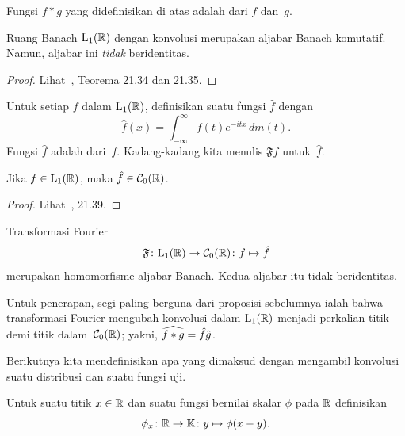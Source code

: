 \begin{defn} Fungsi $f \ast g$ yang didefinisikan di atas adalah
 dari $f$ dan~$g$.
\end{defn}

\begin{prop} Ruang Banach $\mathrm{L_{1}}(\mathbb{R})$ dengan konvolusi merupakan aljabar Banach komutatif. Namun, aljabar ini \emph{tidak} beridentitas.
\end{prop}

\begin{proof} Lihat~\cite{HewittS:1965}, Teorema 21.34 dan 21.35.  \ns
\end{proof}

\begin{defn}\label{defn_Fourier_transform} Untuk setiap $f$ dalam $\mathrm{L_{1}}(\mathbb{R})$, definisikan suatu fungsi $\hat f$ dengan
    \[ \hat f(x) = \int_{-\infty}^\infty f(t) e^{-itx}\,dm(t). \]
Fungsi $\hat f$ adalah
 dari~$f$. Kadang-kadang kita menulis $\mathfrak Ff$ untuk~$\hat f$.
\end{defn}

\begin{thm} Jika $f \in \mathrm{L_{1}}(\mathbb{R})$,
maka $\hat f \in \mathcal{C}_0(\mathbb{R})$.
\end{thm}

\begin{proof} Lihat~\cite{HewittS:1965}, 21.39.   \ns
\end{proof}

\begin{prop} Transformasi Fourier
   \[ \mathfrak F\colon \mathrm{L_{1}}(\mathbb{R}) \rightarrow \mathcal{C}_0(\mathbb{R})\colon f \mapsto \hat f \]
merupakan homomorfisme aljabar Banach. Kedua aljabar itu tidak beridentitas.
\end{prop}

Untuk penerapan, segi paling berguna dari proposisi sebelumnya ialah bahwa transformasi Fourier
mengubah konvolusi dalam $\mathrm{L_{1}}(\mathbb{R})$ menjadi
perkalian titik demi titik dalam~$\mathcal{C}_0(\mathbb{R})$; yakni, $\widehat{f\ast g} =\hat f\hat g$.

Berikutnya kita mendefinisikan apa yang dimaksud dengan mengambil konvolusi suatu distribusi dan suatu fungsi uji.

\begin{notn} Untuk suatu titik $x \in \mathbb{R}$ dan suatu fungsi bernilai skalar $\phi$ pada $\mathbb{R}$
definisikan
   \[ \phi_x\colon \mathbb{R} \rightarrow \mathbb{K}\colon y \mapsto \phi(x - y). \]
\end{notn}

